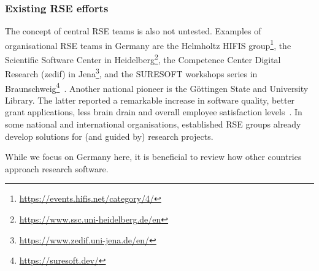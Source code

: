 \documentclass[a4paper]{article}
\makeatletter
\newcommand*{\eg}{e.\,g.\@\xspace}
\makeatother
\begin{document}
\subsubsection{Existing RSE efforts}
The concept of central RSE teams is also not untested.
Examples  of organisational RSE teams in Germany are
 the Helmholtz HIFIS group\footnote{\url{https://events.hifis.net/category/4/}}\autocite{haupt_hifis_consulting_2021},
 the Scientific Software Center in Heidelberg\footnote{\url{https://www.ssc.uni-heidelberg.de/en}}\autocite{ulusoy_heidelberg_ssc_2024},
 the Competence Center Digital Research (zedif) in Jena\footnote{\url{https://www.zedif.uni-jena.de/en/}},
 and the SURESOFT workshops series in Braunschweig\footnote{\url{https://suresoft.dev/}}~\autocite{Blech2022}.
Another national pioneer is the Göttingen State and University Library.
The latter reported a remarkable increase in software quality, better grant applications, less brain drain and overall employee satisfaction levels~\autocite{schimavoigt2023}.
In some national and international organisations, established RSE groups already develop solutions for (and guided by) research projects.

While we focus on Germany here, it is beneficial to review how other countries approach research software.

\end{document}
